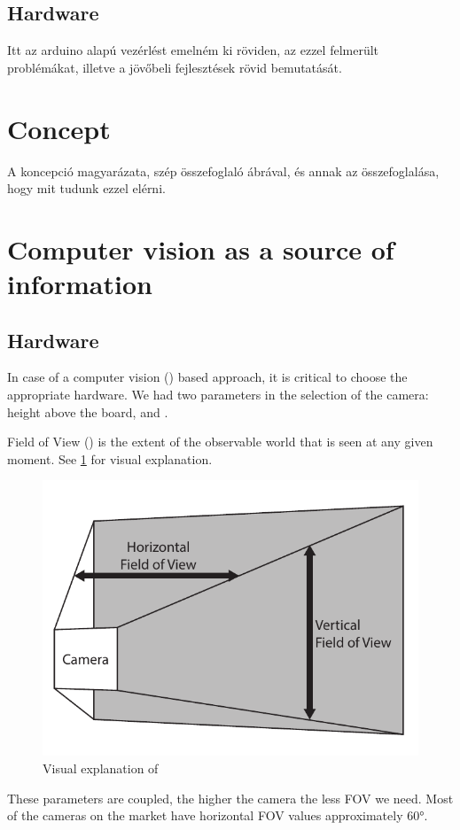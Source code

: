 	\subsection{Hardware}
	Itt az arduino alapú vezérlést emelném ki röviden, az ezzel felmerült problémákat, illetve a jövőbeli fejlesztések rövid bemutatását.

\section{Concept}
	A koncepció magyarázata, szép összefoglaló ábrával, és annak az összefoglalása, hogy mit tudunk ezzel elérni.

\section{Computer vision as a source of information}

\subsection{Hardware}
\label{sec:case_study:hardware}

In case of a computer vision () based approach, it is critical to choose the appropriate hardware. We had two parameters in the selection of the camera: height above the board, and .

\begin{dfn}
	Field of View () is the extent of the observable world that is seen at any given moment. See \cref{fig:case_study:fov} for visual explanation.
\end{dfn}

\begin{figure}[h]
	\centering
	\includegraphics[width=0.5\linewidth]{include/figures/chapter_6/opencv_1}
	\caption{Visual explanation of }
	\label{fig:case_study:fov}
\end{figure}

These parameters are coupled, the higher the camera the less FOV we need. Most of the cameras on the market have horizontal FOV values approximately \ang{60}.

